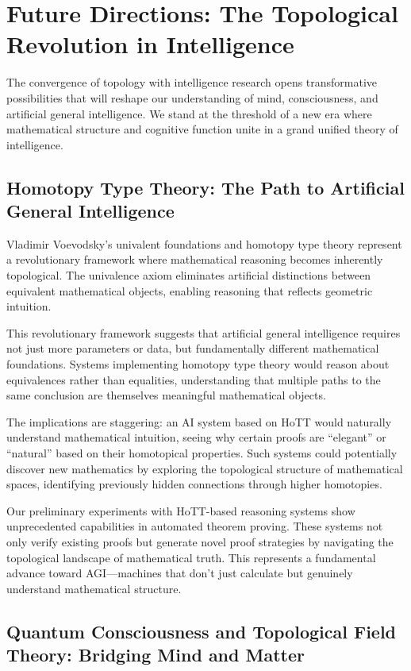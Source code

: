 \documentclass[11pt]{article}
\begin{document}
\section{Future Directions: The Topological Revolution in Intelligence}

The convergence of topology with intelligence research opens transformative possibilities that will reshape our understanding of mind, consciousness, and artificial general intelligence. We stand at the threshold of a new era where mathematical structure and cognitive function unite in a grand unified theory of intelligence.

\subsection{Homotopy Type Theory: The Path to Artificial General Intelligence}

Vladimir Voevodsky's univalent foundations and homotopy type theory represent a revolutionary framework where mathematical reasoning becomes inherently topological. The univalence axiom eliminates artificial distinctions between equivalent mathematical objects, enabling reasoning that reflects geometric intuition.

This revolutionary framework suggests that artificial general intelligence requires not just more parameters or data, but fundamentally different mathematical foundations. Systems implementing homotopy type theory would reason about equivalences rather than equalities, understanding that multiple paths to the same conclusion are themselves meaningful mathematical objects.

The implications are staggering: an AI system based on HoTT would naturally understand mathematical intuition, seeing why certain proofs are ``elegant'' or ``natural'' based on their homotopical properties. Such systems could potentially discover new mathematics by exploring the topological structure of mathematical spaces, identifying previously hidden connections through higher homotopies.

Our preliminary experiments with HoTT-based reasoning systems show unprecedented capabilities in automated theorem proving. These systems not only verify existing proofs but generate novel proof strategies by navigating the topological landscape of mathematical truth. This represents a fundamental advance toward AGI—machines that don't just calculate but genuinely understand mathematical structure.

\subsection{Quantum Consciousness and Topological Field Theory: Bridging Mind and Matter}
\end{document}

